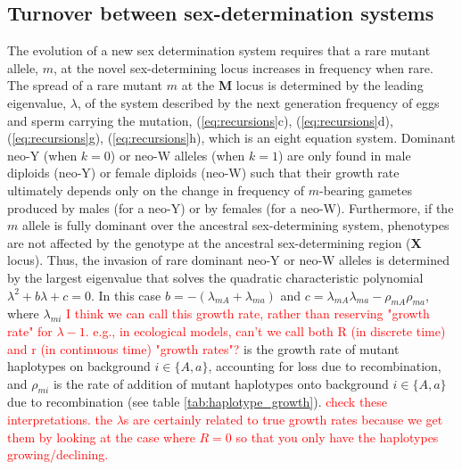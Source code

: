 \documentclass[12pt]{article}
\begin{document}
\subsection*{Turnover between sex-determination systems} 
The evolution of a new sex determination system requires that a rare mutant allele, $m$, at the novel sex-determining locus  increases in frequency when rare. 
The spread of a rare mutant $m$ at the \textbf{M} locus is determined by the leading eigenvalue, $\lambda$, of the system described by the next generation frequency of eggs and sperm carrying the mutation, (\ref{eq:recursions}c), (\ref{eq:recursions}d), (\ref{eq:recursions}g), (\ref{eq:recursions}h), which is an eight equation system. %
Dominant neo-Y (when $k=0$) or neo-W alleles (when $k=1$) are only found in male diploids (neo-Y) or female diploids (neo-W) such that their growth rate ultimately depends only on the change in frequency of $m$-bearing gametes produced by males (for a neo-Y) or by females (for a neo-W). 
Furthermore, if the $m$ allele is fully dominant over the ancestral sex-determining system, phenotypes are not affected by the genotype at the ancestral sex-determining region (\textbf{X} locus). 
Thus, the invasion of rare dominant neo-Y or neo-W alleles is determined by the largest eigenvalue that solves the quadratic characteristic polynomial
$\lambda^2+ b \lambda + c =0$.
%
In this case $b= - (\lambda_{mA} + \lambda_{ma})$ and $c = \lambda_{mA} \lambda_{ma} -\rho_{mA} \rho_{ma}$, where $\lambda_{mi}$ \textcolor{red}{I think we can call this growth rate, rather than reserving "growth rate" for $\lambda-1$. e.g., in ecological models, can't we call both R (in discrete time) and r (in continuous time) "growth rates"?} is the growth rate of mutant haplotypes on background $i\in\{A,a\}$, accounting for loss due to recombination, and $\rho_{mi}$ is the rate of addition of mutant haplotypes onto background $i\in\{A,a\}$ due to recombination (see table \ref{tab:haplotype_growth}).
\textcolor{red}{check these interpretations. the $\lambda$s are certainly related to true growth rates because we get them by looking at the case where $R=0$ so that you only have the haplotypes growing/declining. }
\end{document}

